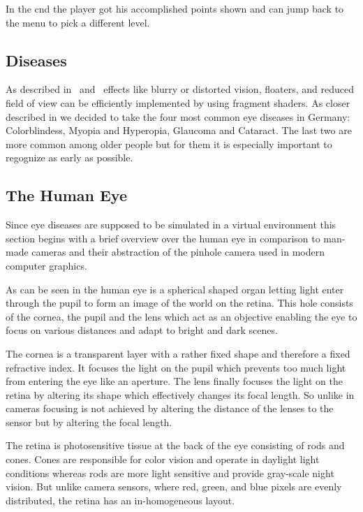 \documentclass{sig-alternate-05-2015}
\begin{document}
In the cnd the player got his accomplished points shown and can jump back to the menu to pick a different level. 

\subsection{Diseases}

As described in \cite{gazedisplays} and \cite{eyediseasesim} effects like blurry or distorted vision, floaters, and reduced field of view can be efficiently implemented by using fragment shaders.
As closer described in  we decided to take the four most common eye diseases in Germany: Colorblindess, Myopia and Hyperopia, Glaucoma and Cataract.
The last two are more common among older people but for them it is especially important to regognize as early as possible. 

\subsection{The Human Eye}
\label{sec:eyediseases}
Since eye diseases are supposed to be simulated in a virtual environment this section begins with a brief overview over the human eye in comparison to man-made cameras and their abstraction of the pinhole camera used in modern computer graphics.

As can be seen in  the human eye is a spherical shaped organ letting light enter through the pupil to form an image of the world on the retina.
This hole consists of the cornea, the pupil and the lens which act as an objective enabling the eye to focus on various distances and adapt to bright and dark scenes.

The cornea is a transparent layer with a rather fixed shape and therefore a fixed refractive index.
It focuses the light on the pupil which prevents too much light from entering the eye like an aperture.
The lens finally focuses the light on the retina by altering its shape which effectively changes its focal length.
So unlike in cameras focusing is not achieved by altering the distance of the lenses to the sensor but by altering the focal length.

The retina is photosensitive tissue at the back of the eye consisting of rods and cones.
Cones are responsible for color vision and operate in daylight light conditions whereas rods are more light sensitive and provide gray-scale night vision.
But unlike camera sensors, where red, green, and blue pixels are evenly distributed, the retina has an in-homogeneous layout.
\end{document}
